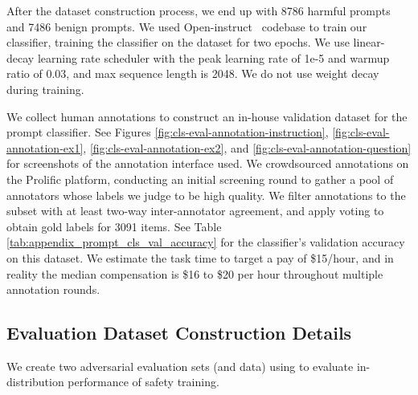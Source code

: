 After the dataset construction process, we end up with 8786 harmful prompts and 7486 benign prompts. We used Open-instruct~\citep{wang2023far} codebase to train our classifier, training the classifier on the dataset for two epochs. We use linear-decay learning rate scheduler with the peak learning rate of 1e-5 and warmup ratio of 0.03, and max sequence length is 2048. We do not use weight decay during training.

We collect human annotations to construct an in-house validation dataset for the prompt classifier. 
See Figures \ref{fig:cls-eval-annotation-instruction}, \ref{fig:cls-eval-annotation-ex1}, \ref{fig:cls-eval-annotation-ex2}, and \ref{fig:cls-eval-annotation-question} for screenshots of the annotation interface used. 
We crowdsourced annotations on the Prolific platform, conducting an initial screening round to gather a pool of annotators whose labels we judge to be high quality. 
We filter annotations to the subset with at least two-way inter-annotator agreement, and apply voting to obtain gold labels for 3091 items. See Table \ref{tab:appendix_prompt_cls_val_accuracy} for the classifier's validation accuracy on this dataset. 
We estimate the task time to target a pay of \$15/hour, and in reality the median compensation is \$16 to \$20 per hour throughout multiple annotation rounds.

\subsection{\dataset Evaluation Dataset Construction Details}
\label{assec:eval_data_construction}

We create two adversarial evaluation sets (\ie \advb and \advh data) using \method to evaluate in-distribution performance of safety training.

